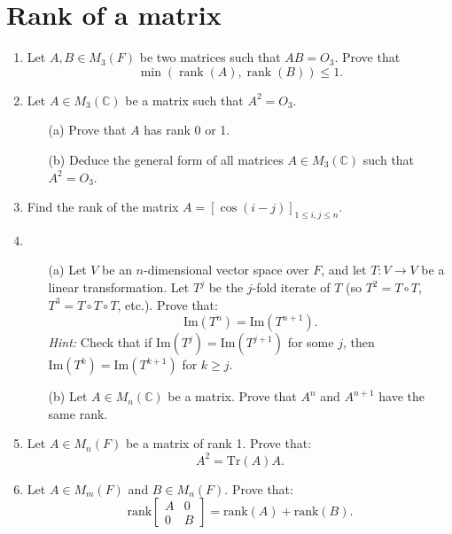\documentclass{article}
\theoremstyle{remark}
\begin{document}
\section*{Rank of a matrix}
    \begin{enumerate}
        \item Let \( A, B \in M_3(F) \) be two matrices such that \( AB = O_3 \). Prove that 
        \[
        \min(\operatorname{rank}(A), \operatorname{rank}(B)) \leq 1.
        \]

        \item Let \( A \in M_3(\mathbb{C}) \) be a matrix such that \( A^2 = O_3 \).

        \begin{enumerate}
            \item[(a)] Prove that \( A \) has rank 0 or 1.
            \item[(b)] Deduce the general form of all matrices \( A \in M_3(\mathbb{C}) \) such that \( A^2 = O_3 \).
        \end{enumerate}

        \item Find the rank of the matrix \( A = [\cos(i - j)]_{1 \leq i,j \leq n} \).

        \item
        \begin{enumerate}
            \item[(a)] Let \( V \) be an \( n \)-dimensional vector space over \( F \), and let \( T : V \to V \) be a linear transformation. Let \( T^j \) be the \( j \)-fold iterate of \( T \) (so \( T^2 = T \circ T \), \( T^3 = T \circ T \circ T \), etc.). Prove that:
            \[
            \text{Im}(T^n) = \text{Im}(T^{n+1}).
            \]
            \textit{Hint:} Check that if \( \text{Im}(T^j) = \text{Im}(T^{j+1}) \) for some \( j \), then \( \text{Im}(T^k) = \text{Im}(T^{k+1}) \) for \( k \geq j \).
            
            \item[(b)] Let \( A \in M_n(\mathbb{C}) \) be a matrix. Prove that \( A^n \) and \( A^{n+1} \) have the same rank.
        \end{enumerate}

        \item Let \( A \in M_n(F) \) be a matrix of rank 1. Prove that:
        \[
        A^2 = \text{Tr}(A)A.
        \]

        \item Let \( A \in M_m(F) \) and \( B \in M_n(F) \). Prove that:
        \[
        \text{rank} \begin{bmatrix}
        A & 0 \\
        0 & B
        \end{bmatrix} = \text{rank}(A) + \text{rank}(B).
        \]


\end{enumerate}
\end{document}
